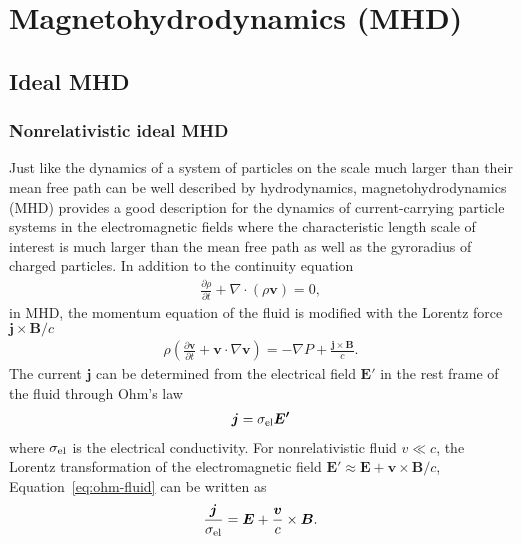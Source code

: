 
\chapter{Magnetohydrodynamics (MHD)}
\label{chap:mhd}

\section{Ideal MHD}
\label{sec:ideal}

\subsection{Nonrelativistic ideal MHD}
Just like the dynamics of a system of particles on the scale much larger than their mean free path can be well described by hydrodynamics, magnetohydrodynamics (MHD) provides a good description for the dynamics of current-carrying particle systems in the electromagnetic fields where the characteristic length scale of interest is much larger than the mean free path as well as the gyroradius of charged particles.
In addition to the continuity equation
\begin{eqnarray}\label{eq:mhd-continuity}
	\frac{\partial \rho}{\partial t} + \nabla \cdot (\rho \boldsymbol{v})=0,
\end{eqnarray}
in MHD, the momentum equation of the fluid is modified with the Lorentz force $\boldsymbol{j}\times \boldsymbol{B}/c$
\begin{eqnarray}\label{eq:mhd-vel}
	\rho \left(\frac{\partial \boldsymbol{v}}{\partial t} + \boldsymbol{v}\cdot \nabla \boldsymbol{v}\right) = -\nabla P +\frac{ \boldsymbol{j}\times \boldsymbol{B}}{c}.
\end{eqnarray}
The current $\boldsymbol{j}$ can be determined from the electrical field $\boldsymbol{E'}$ in the rest frame of the fluid through Ohm's law
\begin{eqnarray}\label{eq:ohm-fluid}
	\boldsymbol{j} = \sigma_{\rm el} \boldsymbol{E'}
\end{eqnarray}
where $\sigma_{\rm el}$ is the electrical conductivity.
For nonrelativistic fluid $v\ll c$, the Lorentz transformation of the electromagnetic field $\boldsymbol{E'} \approx \boldsymbol{E} + \boldsymbol{v}\times \boldsymbol{B}/c$, Equation~\ref{eq:ohm-fluid} can be written as 
\begin{eqnarray}\label{eq:mhd-j}
	\frac{\boldsymbol{j}}{\sigma_{\rm el}} = \boldsymbol{E} +\frac{ \boldsymbol{v}}{c}\times \boldsymbol{B}.
\end{eqnarray}
